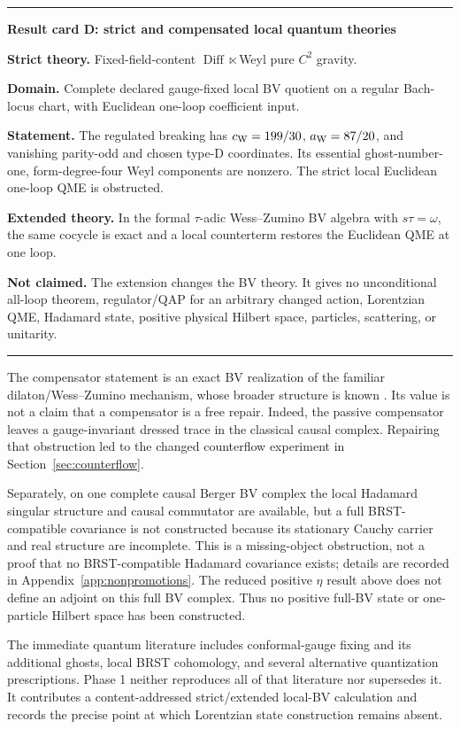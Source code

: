 \documentclass[11pt]{article}
\newcommand{\Diff}{\operatorname{Diff}}
\newenvironment{resultcard}[1]
 {\par\medskip\noindent\hrule\smallskip\noindent\textbf{#1}\par\smallskip}
 {\par\smallskip\hrule\medskip}
\begin{document}
\begin{resultcard}{Result card D: strict and compensated local quantum theories}
\textbf{Strict theory.} Fixed-field-content $\Diff\ltimes$Weyl pure $C^2$
gravity.\par
\textbf{Domain.} Complete declared gauge-fixed local BV quotient on a regular
Bach-locus chart, with Euclidean one-loop coefficient input.\par
\textbf{Statement.} The regulated breaking has $c_{\rm W}=199/30$,
$a_{\rm W}=87/20$, and vanishing parity-odd and chosen type-D coordinates.
Its essential ghost-number-one, form-degree-four Weyl components are
nonzero.  The strict local
Euclidean one-loop QME is obstructed.\par
\textbf{Extended theory.} In the formal $\tau$-adic Wess--Zumino BV algebra
with $s\tau=\omega$, the same cocycle is exact and a local counterterm restores
the Euclidean QME at one loop.\par
\textbf{Not claimed.} The extension changes the BV theory.  It gives no
unconditional all-loop theorem, regulator/QAP for an arbitrary changed
action, Lorentzian QME, Hadamard state, positive physical Hilbert space,
particles, scattering, or unitarity.
\end{resultcard}

The compensator statement is an exact BV realization of the familiar
dilaton/Wess--Zumino mechanism, whose broader structure is known
\cite{BaumeKerenZur}.  Its value is not a claim that a compensator is a free
repair.  Indeed, the passive compensator leaves a gauge-invariant dressed
trace in the classical causal complex.  Repairing that obstruction led to
the changed counterflow experiment in Section~\ref{sec:counterflow}.

Separately, on one complete causal Berger BV complex the local Hadamard
singular structure and causal commutator are available, but a full
BRST-compatible covariance is not constructed because its stationary Cauchy
carrier and real structure are incomplete.  This is a missing-object
obstruction, not a proof that no BRST-compatible Hadamard covariance exists;
details are recorded in Appendix~\ref{app:nonpromotions}.  The reduced
positive $\eta$ result above does not define an adjoint on this full BV
complex.  Thus no positive full-BV state or one-particle Hilbert space has
been constructed.

The immediate quantum literature includes conformal-gauge fixing and its
additional ghosts, local BRST cohomology, and several alternative
quantization prescriptions\cite{Rachwal,BarnichBrandtHenneaux}.  Phase 1
neither reproduces all of that literature nor supersedes it.  It contributes
a content-addressed strict/extended local-BV calculation and records the
precise point at which Lorentzian state construction remains absent.
\end{document}
